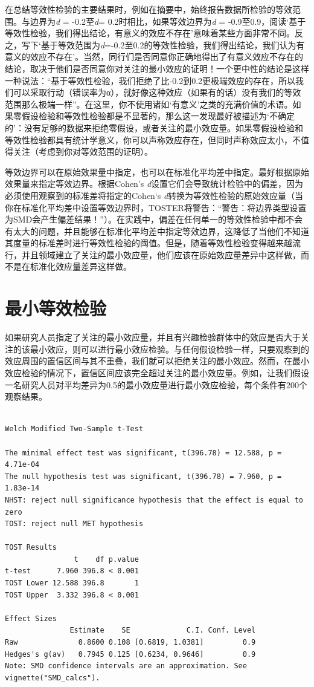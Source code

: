 \documentclass[
  letterpaper,
  DIV=11,
  numbers=noendperiod]{scrreprt}
\begin{document}
在总结等效性检验的主要结果时，例如在摘要中，始终报告数据所检验的等效范围。与边界为\emph{d}
= -0.2至\emph{d}= 0.2时相比，如果等效边界为\emph{d} =
-0.9至0.9，阅读`基于等效性检验，我们得出结论，有意义的效应不存在'意味着某些方面非常不同。反之，写下`基于等效范围为\emph{d}=-0.2至0.2的等效性检验，我们得出结论，我们认为有意义的效应不存在'。当然，同行们是否同意你正确地得出了有意义效应不存在的结论，取决于他们是否同意你对关注的最小效应的证明！一个更中性的结论是这样一种说法：``基于等效性检验，我们拒绝了比-0.2到0.2更极端效应的存在，所以我们可以采取行动（错误率为α），就好像这种效应（如果有的话）没有我们的等效范围那么极端一样''。在这里，你不使用诸如`有意义'之类的充满价值的术语。如果零假设检验和等效性检验都是不显著的，那么这一发现最好被描述为`不确定的'：没有足够的数据来拒绝零假设，或者关注的最小效应量。如果零假设检验和等效性检验都具有统计学意义，你可以声称效应存在，但同时声称效应太小，不值得关注（考虑到你对等效范围的证明）。

等效边界可以在原始效果量中指定，也可以在标准化平均差中指定。最好根据原始效果量来指定等效边界。根据Cohen's
\emph{d}设置它们会导致统计检验中的偏差，因为必须使用观察到的标准差将指定的Cohen`s
\emph{d}转换为等效性检验的原始效应量（当你在标准化平均差中设置等效边界时，TOSTER将警告：``警告：将边界类型设置为SMD会产生偏差结果！''）。在实践中，偏差在任何单一的等效性检验中都不会有太大的问题，并且能够在标准化平均差中指定等效边界，这降低了当他们不知道其度量的标准差时进行等效性检验的阈值。但是，随着等效性检验变得越来越流行，并且领域建立了关注的最小效应量，他们应该在原始效应量差异中这样做，而不是在标准化效应量差异这样做。

\hypertarget{sec-MET}{%
\section{最小等效检验}\label{sec-MET}}

如果研究人员指定了关注的最小效应量，并且有兴趣检验群体中的效应是否大于关注的该最小效应，则可以进行最小效应检验。与任何假设检验一样，只要观察到的效应周围的置信区间与其不重叠，我们就可以拒绝关注的最小效应。然而，在最小效应检验的情况下，置信区间应该完全超过关注的最小效应量。例如，让我们假设一名研究人员对平均差异为0.5的最小效应量进行最小效应检验，每个条件有200个观察结果。

\begin{verbatim}

Welch Modified Two-Sample t-Test

The minimal effect test was significant, t(396.78) = 12.588, p = 4.71e-04
The null hypothesis test was significant, t(396.78) = 7.960, p = 1.83e-14
NHST: reject null significance hypothesis that the effect is equal to zero 
TOST: reject null MET hypothesis

TOST Results 
                t    df p.value
t-test      7.960 396.8 < 0.001
TOST Lower 12.588 396.8       1
TOST Upper  3.332 396.8 < 0.001

Effect Sizes 
               Estimate    SE             C.I. Conf. Level
Raw              0.8600 0.108 [0.6819, 1.0381]         0.9
Hedges's g(av)   0.7945 0.125 [0.6234, 0.9646]         0.9
Note: SMD confidence intervals are an approximation. See vignette("SMD_calcs").
\end{verbatim}
\end{document}
